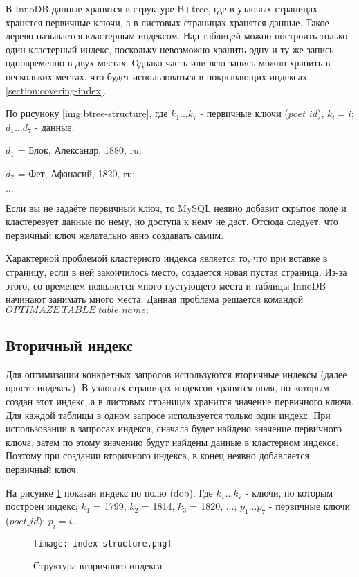 В InnoDB данные хранятся в структуре B+tree, где в узловых страницах хранятся первичные ключи, а в листовых страницах хранятся данные. Такое дерево называется кластерным индексом. Над таблицей можно построить только один кластерный индекс, поскольку невозможно хранить одну и ту же запись одновременно в двух местах. Однако часть или всю запись можно хранить в нескольких местах, что будет использоваться в покрывающих индексах \ref{section:covering-index}.

По рисуноку \ref{img:btree-structure}, где $k_1 \ldots k_7$ - первичные ключи ($poet\_id$), $k_i = i$; $d_1 \ldots d_7$ - данные.

$d_1$ = Блок, Александр, 1880, ru; 

$d_2$ = Фет, Афанасий, 1820, ru;

$\ldots$

Если вы не задаёте первичный ключ, то MySQL неявно добавит скрытое поле и кластерезует данные по нему, но доступа к нему не даст. Отсюда следует, что первичный ключ желательно явно создавать самим.

Характерной проблемой кластерного индекса является то, что при вставке в страницу, если в ней закончилось место, создается новая пустая страница. Из-за этого, со временем появляется много пустующего места и таблицы InnoDB начинают занимать много места. Данная проблема решается командой $OPTIMAZE\:TABLE\;table\_name;$

\subsection{Вторичный индекс}

Для оптимизации конкретных запросов используются вторичные индексы (далее просто индексы). В узловых страницах индексов хранятся поля, по которым создан этот индекс, а в листовых страницах хранится значение первичного ключа. Для каждой таблицы в одном запросе используется только один индекс. При использовании в запросах индекса, сначала будет найдено значение первичного ключа, затем по этому значению будут найдены данные в кластерном индексе. Поэтому при создании вторичного индекса, в конец неявно добавляется первичный ключ.

На рисунке \ref{img:index-structure} показан индекс по полю (dob). Где $k_1 \ldots k_7$ - ключи, по которым построен индекс; $k_1$ = 1799, $k_2$ = 1814, $k_3$ = 1820, $\ldots$; $p_1 \ldots p_7$ - первичные ключи ($poet\_id$); $p_i = i$.

\begin{figure}[H]
  \centering
  \texttt{[image: index-structure.png]}
  \caption{Структура вторичного индекса}
  \label{img:index-structure}
\end{figure}

